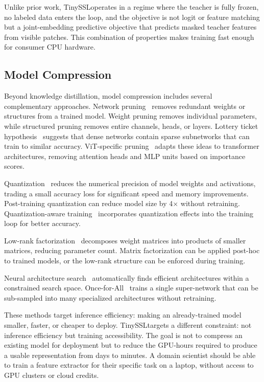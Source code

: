 \documentclass{article}
\newcommand{\method}{TinySSL}
\begin{document}
Unlike prior work, \method operates in a regime where the teacher is fully frozen, no labeled data enters the loop, and the objective is not logit or feature matching but a joint-embedding predictive objective that predicts masked teacher features from visible patches. This combination of properties makes training fast enough for consumer CPU hardware.

\subsection{Model Compression}

Beyond knowledge distillation, model compression includes several complementary approaches. Network pruning~\cite{lottery} removes redundant weights or structures from a trained model. Weight pruning removes individual parameters, while structured pruning removes entire channels, heads, or layers. Lottery ticket hypothesis~\cite{lottery} suggests that dense networks contain sparse subnetworks that can train to similar accuracy. ViT-specific pruning~\cite{vitprune} adapts these ideas to transformer architectures, removing attention heads and MLP units based on importance scores.

Quantization~\cite{qbert} reduces the numerical precision of model weights and activations, trading a small accuracy loss for significant speed and memory improvements. Post-training quantization can reduce model size by 4$\times$ without retraining. Quantization-aware training~\cite{quantaware} incorporates quantization effects into the training loop for better accuracy.

Low-rank factorization~\cite{svd_compress} decomposes weight matrices into products of smaller matrices, reducing parameter count. Matrix factorization can be applied post-hoc to trained models, or the low-rank structure can be enforced during training.

Neural architecture search~\cite{nas, onceforall} automatically finds efficient architectures within a constrained search space. Once-for-All~\cite{onceforall} trains a single super-network that can be sub-sampled into many specialized architectures without retraining.

These methods target inference efficiency: making an already-trained model smaller, faster, or cheaper to deploy. \method targets a different constraint: not inference efficiency but training accessibility. The goal is not to compress an existing model for deployment but to reduce the GPU-hours required to produce a usable representation from days to minutes. A domain scientist should be able to train a feature extractor for their specific task on a laptop, without access to GPU clusters or cloud credits.
\end{document}
